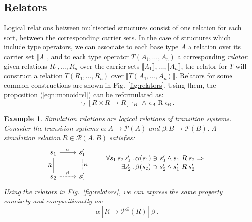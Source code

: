 \documentclass[draft,11pt]{report}
\newtheorem{example}[theorem]{Example}
\theoremstyle{definition}
\newcommand{\ifr}[1]{\mathrel{[{#1}]}}
\begin{document}
\subsection{Relators} \label{sec:relators}

Logical relations between multisorted structures
consist of one relation for each sort,
between the corresponding carrier sets.
In the case of structures which include type operators,
we can associate to each base type $A$
a relation over its carrier set $\llbracket A \rrbracket$,
and to each type operator $T(A_1, \ldots, A_n)$
a corresponding \emph{relator}:
given relations $R_1, \ldots, R_n$ over
the carrier sets $\llbracket A_1 \rrbracket, \ldots, \llbracket A_n \rrbracket$,
the relator for $T$
will construct a relation $T(R_1, \ldots, R_n)$
over $\llbracket T(A_1, \ldots, A_n) \rrbracket$.
Relators for some common constructions are shown in Fig.~\ref{fig:relators}.
Using them, the proposition (\ref{eqn:monoidrel}) can be reformulated as:
\[
  \cdot_A \ifr{R \times R \rightarrow R} \cdot_B
  \: \wedge \:
  \epsilon_A \mathrel{R} \epsilon_B \,.
\]

\begin{example} \label{ex:simrel} %
Simulation relations are
logical relations of transition systems.
Consider the transition systems
$\alpha : A \rightarrow \mathcal{P}(A)$ and
$\beta : B \rightarrow \mathcal{P}(B)$.
A simulation relation $R \in \mathcal{R}(A, B)$
satisfies:
\[
  \begin{tikzcd}[scale=0.8]
    s_1 \arrow[r, "\alpha"]
        \arrow[d, dash, "R"'] &
    s_1' \arrow[d, dashed, dash, "R"] \\
    s_2 \arrow[r, dashed, "\beta"] &
    s_2'
  \end{tikzcd}
  \qquad
  \label{eqn:simrel}
  \begin{array}{r@{\,.\,}l}
    \forall s_1 \, s_2 \, s_1' &
      \alpha(s_1) \ni s_1' \wedge s_1 \mathrel{R} s_2 \Rightarrow
    \\[0.25ex]
    \exists s_2' &
      \beta(s_2) \ni s_2' \wedge s_1' \mathrel{R} s_2'
  \end{array}
\]
Using the relators in Fig.~\ref{fig:relators},
we can express the same property
concisely and compositionally as:
\[
  \alpha \ifr{R \rightarrow \mathcal{P}^\le(R)} \beta \,.
\]
\end{example}
\end{document}
